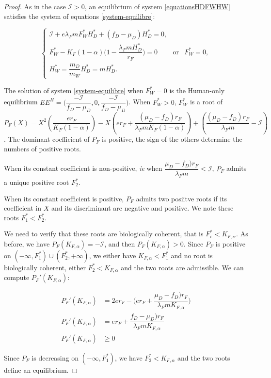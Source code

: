 \documentclass{article}
\newcommand{\lfw}{\lambda_{F}}
\newcommand{\lfw}{\lambda_{F}}
\newcommand{\Kfa}{K_{F,\alpha}}
\newcommand{\cI}{\mathcal{I}}
\begin{document}
\begin{proof}
As in the case $\cI > 0$, an equilibrium of system \eqref{equationsHDFWHW} satisfies the system of equations \eqref{system-equilibre}:

\begin{equation*}
\left\lbrace \begin{array}{cll}
\cI + e \lfw m F_W^* H_D^* + (f_D - \mu_D) H_D^* = 0,&&\\
F_W^* - K_F(1-\alpha) \Big(1 - \dfrac{\lfw m H^*_D}{r_F} \Big) = 0& \mbox{or} & F^*_W = 0,\\
H_W^* = \dfrac{m_D}{m_W} H_D^* = m H_D^*.&&
\end{array} \right.
\end{equation*}

The solution of system \eqref{system-equilibre} when $F_W^* = 0$ is the Human-only equilibrium $EE^{H} = \Big(\dfrac{-\cI}{f_D - \mu_D}, 0, \dfrac{-\cI}{f_D - \mu_D} \Big)$.
When $F_W^* > 0$, $F^*_W$ is a root of
$$
P_F(X) = X^2 \left(\dfrac{er_F}{K_F(1-\alpha)} \right) - X \left(er_F + \dfrac{(\mu_D - f_D) r_F}{\lfw m K_F(1-\alpha)} \right) + \left(\dfrac{(\mu_D - f_D) r_F}{\lfw m} - \cI \right)$$. The dominant coefficient of $P_F$ is positive, the sign of the others determine the numbers of positive roots. 

When its constant coefficient is non-positive, \textit{ie} when $\dfrac{\mu_D - f_D)r_F}{\lfw m} \leq \cI$, $P_F$ admits a unique positive root $F_2^*$.

When its constant coefficient is positive, $P_F$ admits two posiitve roots if its coefficient in $X$ and its discriminant are negative and positive. We note these roots $F^*_1 < F_2^*$.

We need to verify that these roots are biologically coherent, that is $F^*_i < \Kfa$. As before, we have $P_F(\Kfa) = -\cI$, and then $P_F(\Kfa) > 0$. Since $P_F$ is positive on $(-\infty, F_1^*) \cup (F_2^*, +\infty)$, we either have $\Kfa < F_1^*$ and no root is biologically coherent, either $F_2^* < \Kfa$ and the two roots are admissible. We can compute $P_F'(\Kfa)$:

\begin{align*}
P_F'(\Kfa) &= 2 er_F - \Big(e r_F + \dfrac{\mu_D - f_D)r_F}{\lfw m \Kfa} \Big) \\
P_F'(\Kfa) &= er_F + \dfrac{f_D - \mu_D)r_F}{\lfw m \Kfa} \\
P_F'(\Kfa) & \geq 0
\end{align*}

Since $P_F$ is decreasing on $(-\infty, F_1^*)$, we have $F_2^* < \Kfa$ and the two roots define an equilibrium.
\end{proof}
\end{document}
